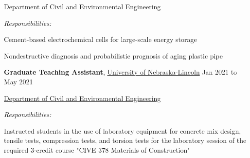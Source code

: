 \documentclass[10pt]{article}
\begin{document}
\begin{innerlist}
	\item[] \href{https://engineering.unl.edu/cee/}{Department of Civil and Environmental Engineering}\\
	\begin{innerlist}
		\item \textit{Responsibilities:}
		\begin{innerlist}
			\item Cement-based electrochemical cells for large-scale energy storage
			\item Nondestructive diagnosis and probabilistic prognosis of aging plastic pipe\\
		\end{innerlist}       
	\end{innerlist}
\end{innerlist}



\textbf{Graduate Teaching Assistant},
            \href{https://www.unl.edu/}{University of Nebraska-Lincoln}
            \hfill {Jan 2021 to May 2021}

\begin{innerlist}
    \item[] \href{https://engineering.unl.edu/cee/}{Department of Civil and Environmental Engineering}\\
    \begin{innerlist}
        \item \textit{Responsibilities:}
            \begin{innerlist}
                \item Instructed students in the use of laboratory equipment for concrete mix design, tensile tests, compression tests, and torsion tests for the laboratory session of the required 3-credit course "CIVE 378 Materials of Construction"\\
            \end{innerlist}       
    \end{innerlist}
\end{innerlist}
\end{document}
